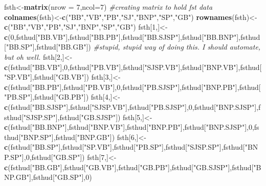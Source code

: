 \documentclass[]{article}
\newenvironment{Shaded}{\begin{snugshade}}{\end{snugshade}}
\newcommand{\KeywordTok}[1]{\textcolor[rgb]{0.13,0.29,0.53}{\textbf{#1}}}
\newcommand{\DataTypeTok}[1]{\textcolor[rgb]{0.13,0.29,0.53}{#1}}
\newcommand{\DecValTok}[1]{\textcolor[rgb]{0.00,0.00,0.81}{#1}}
\newcommand{\StringTok}[1]{\textcolor[rgb]{0.31,0.60,0.02}{#1}}
\newcommand{\CommentTok}[1]{\textcolor[rgb]{0.56,0.35,0.01}{\textit{#1}}}
\newcommand{\NormalTok}[1]{#1}
\begin{document}
\begin{Shaded}
\begin{Highlighting}[]
\NormalTok{fsth<-}\KeywordTok{matrix}\NormalTok{(}\DataTypeTok{nrow =} \DecValTok{7}\NormalTok{,}\DataTypeTok{ncol=}\DecValTok{7}\NormalTok{) }\CommentTok{#creating matrix to hold fst data}
\KeywordTok{colnames}\NormalTok{(fsth)<-}\KeywordTok{c}\NormalTok{(}\StringTok{"BB"}\NormalTok{,}\StringTok{"VB"}\NormalTok{,}\StringTok{"PB"}\NormalTok{,}\StringTok{"SJ"}\NormalTok{,}\StringTok{"BNP"}\NormalTok{,}\StringTok{"SP"}\NormalTok{,}\StringTok{"GB"}\NormalTok{)}
\KeywordTok{rownames}\NormalTok{(fsth)<-}\KeywordTok{c}\NormalTok{(}\StringTok{"BB"}\NormalTok{,}\StringTok{"VB"}\NormalTok{,}\StringTok{"PB"}\NormalTok{,}\StringTok{"SJ"}\NormalTok{,}\StringTok{"BNP"}\NormalTok{,}\StringTok{"SP"}\NormalTok{,}\StringTok{"GB"}\NormalTok{)}
\NormalTok{fsth[}\DecValTok{1}\NormalTok{,]<-}\KeywordTok{c}\NormalTok{(}\DecValTok{0}\NormalTok{,fsthud[}\StringTok{"BB.VB"}\NormalTok{],fsthud[}\StringTok{"BB.PB"}\NormalTok{],fsthud[}\StringTok{"BB.SJSP"}\NormalTok{],fsthud[}\StringTok{"BB.BNP"}\NormalTok{],fsthud[}\StringTok{"BB.SP"}\NormalTok{],fsthud[}\StringTok{"BB.GB"}\NormalTok{]) }\CommentTok{#stupid, stupid way of doing this. I should automate, but oh well.}
\NormalTok{fsth[}\DecValTok{2}\NormalTok{,]<-}\KeywordTok{c}\NormalTok{(fsthud[}\StringTok{"BB.VB"}\NormalTok{],}\DecValTok{0}\NormalTok{,fsthud[}\StringTok{"PB.VB"}\NormalTok{],fsthud[}\StringTok{"SJSP.VB"}\NormalTok{],fsthud[}\StringTok{"BNP.VB"}\NormalTok{],fsthud[}\StringTok{"SP.VB"}\NormalTok{],fsthud[}\StringTok{"GB.VB"}\NormalTok{])}
\NormalTok{fsth[}\DecValTok{3}\NormalTok{,]<-}\KeywordTok{c}\NormalTok{(fsthud[}\StringTok{"BB.PB"}\NormalTok{],fsthud[}\StringTok{"PB.VB"}\NormalTok{],}\DecValTok{0}\NormalTok{,fsthud[}\StringTok{"PB.SJSP"}\NormalTok{],fsthud[}\StringTok{"BNP.PB"}\NormalTok{],fsthud[}\StringTok{"PB.SP"}\NormalTok{],fsthud[}\StringTok{"GB.PB"}\NormalTok{])}
\NormalTok{fsth[}\DecValTok{4}\NormalTok{,]<-}\KeywordTok{c}\NormalTok{(fsthud[}\StringTok{"BB.SJSP"}\NormalTok{],fsthud[}\StringTok{"SJSP.VB"}\NormalTok{],fsthud[}\StringTok{"PB.SJSP"}\NormalTok{],}\DecValTok{0}\NormalTok{,fsthud[}\StringTok{"BNP.SJSP"}\NormalTok{],fsthud[}\StringTok{"SJSP.SP"}\NormalTok{],fsthud[}\StringTok{"GB.SJSP"}\NormalTok{])}
\NormalTok{fsth[}\DecValTok{5}\NormalTok{,]<-}\KeywordTok{c}\NormalTok{(fsthud[}\StringTok{"BB.BNP"}\NormalTok{],fsthud[}\StringTok{"BNP.VB"}\NormalTok{],fsthud[}\StringTok{"BNP.PB"}\NormalTok{],fsthud[}\StringTok{"BNP.SJSP"}\NormalTok{],}\DecValTok{0}\NormalTok{,fsthud[}\StringTok{"BNP.SP"}\NormalTok{],fsthud[}\StringTok{"BNP.GB"}\NormalTok{])}
\NormalTok{fsth[}\DecValTok{6}\NormalTok{,]<-}\KeywordTok{c}\NormalTok{(fsthud[}\StringTok{"BB.SP"}\NormalTok{],fsthud[}\StringTok{"SP.VB"}\NormalTok{],fsthud[}\StringTok{"PB.SP"}\NormalTok{],fsthud[}\StringTok{"SJSP.SP"}\NormalTok{],fsthud[}\StringTok{"BNP.SP"}\NormalTok{],}\DecValTok{0}\NormalTok{,fsthud[}\StringTok{"GB.SP"}\NormalTok{])}
\NormalTok{fsth[}\DecValTok{7}\NormalTok{,]<-}\KeywordTok{c}\NormalTok{(fsthud[}\StringTok{"BB.GB"}\NormalTok{],fsthud[}\StringTok{"GB.VB"}\NormalTok{],fsthud[}\StringTok{"GB.PB"}\NormalTok{],fsthud[}\StringTok{"GB.SJSP"}\NormalTok{],fsthud[}\StringTok{"BNP.GB"}\NormalTok{],fsthud[}\StringTok{"GB.SP"}\NormalTok{],}\DecValTok{0}\NormalTok{)}


\end{Highlighting}
\end{Shaded}
\end{document}
